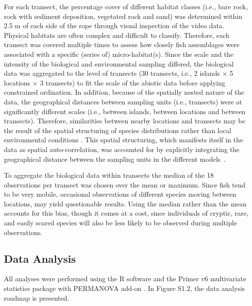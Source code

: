 \documentclass[jmse,article,accept,moreauthors,pdftex]{Definitions/mdpi}
\begin{document}
For each transect, the percentage cover of different habitat classes (i.e., bare rock, rock with sediment deposition, vegetated rock and sand) was determined within 2.5 m of each side of the rope through visual inspection of the video data. Physical habitats are often complex and difficult to classify. Therefore, each transect was covered multiple times to assess how closely fish assemblages were associated with a specific (series of) micro-habitat(s). Since the scale and the intensity of the biological and environmental sampling differed, the biological data was aggregated to the level of transects (30 transects, i.e., 2 islands {×} %
 5 locations {×} 3 transects) to fit the scale of the abiotic data before applying constrained ordination. In addition, because of the spatially nested nature of the data, the geographical distances between sampling units (i.e., transects) were at significantly different scales (i.e., between islands, between locations and between transects). Therefore, similarities between nearby locations and transects may be the result of the spatial structuring of species distributions rather than local environmental conditions \citep{Guisan2006,Kissling2008SpatialModels,Legendre1993SpatialParadigm}. This spatial structuring, which manifests itself in the data as spatial auto-correlation, was accounted for by explicitly integrating the geographical distance between the sampling units in the different models~\citep{Legendre1993SpatialParadigm}. 

To aggregate the biological data within transects the median of the 18 observations per transect was chosen over the mean or maximum. Since fish tend to be very mobile, occasional observations of different species moving between locations, may yield questionable results. Using the median rather than the mean accounts for this bias, though it comes at a cost, since individuals of cryptic, rare, and easily scared species will also be less likely to be observed during multiple observations.

\subsection{Data Analysis}

All analyses were performed using the R software \citep{RCoreTeam2019R:Computing} and the Primer v6 multivariate statistics package \citep{Clarke2006PRIMERManual/Tutorial} with PERMANOVA add-on \citep{Anderson2008PERMANOVA+Methods}. In Figure S1.2, the data analysis roadmap is presented. 
\end{document}

